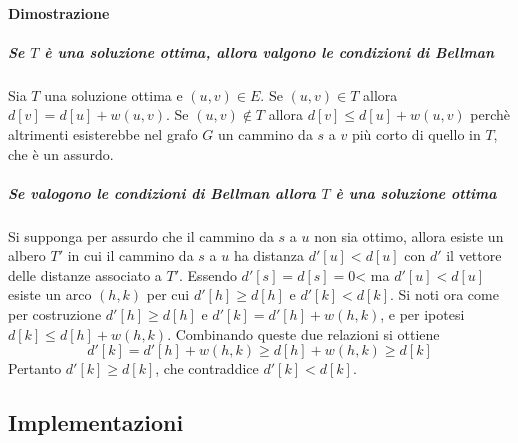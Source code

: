 \paragraph{Dimostrazione}
\subparagraph{Se $T$ \`e una soluzione ottima, allora valgono le condizioni di Bellman} Sia $T$ una soluzione ottima e $(u, v)\in E$. Se $(u, v)\in T$ allora $d[v]=d[u]+w(u, v)$. Se
$(u, v)\not\in T$ allora $d[v]\le d[u]+w(u, v)$ perch\`e altrimenti esisterebbe nel grafo $G$ un cammino da $s$ a $v$ pi\`u corto di quello in $T$, che \`e un assurdo.
\subparagraph{Se valogono le condizioni di Bellman allora $T$ \`e una soluzione ottima} Si supponga per assurdo che il cammino da $s$ a $u$ non sia ottimo, allora esiste un albero $T'$
in cui il cammino da $s$ a $u$ ha distanza $d'[u]<d[u]$ con $d'$ il vettore delle distanze associato a $T'$. Essendo $d'[s]=d[s]=0$< ma $d'[u]<d[u]$ esiste un arco $(h, k)$ per cui 
$d'[h]\ge d[h]$ e $d'[k]<d[k]$. Si noti ora come per costruzione $d'[h]\ge d[h]$ e $d'[k]=d'[h]+w(h, k)$, e per ipotesi $d[k]\le d[h]+w(h, k)$. Combinando queste due relazioni si ottiene
$$ d'[k] = d'[h]+w(h, k)\ge d[h]+w(h, k)\ge d[k]$$ Pertanto $d'[k]\ge d[k]$, che contraddice $d'[k]<d[k]$. 
\subsection{Implementazioni}
